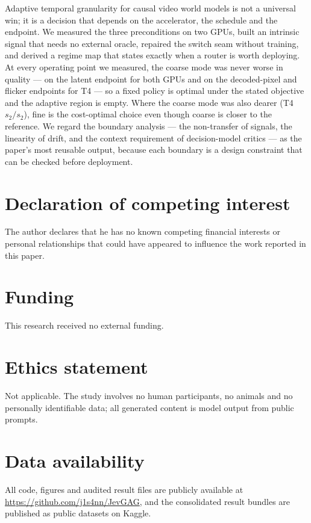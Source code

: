 \documentclass[review]{cas-sc}          %
\begin{document}
Adaptive temporal granularity for causal video world models is not a universal win; it is a decision that
depends on the accelerator, the schedule and the endpoint. We measured the three preconditions on two
GPUs, built an intrinsic signal that needs no external oracle, repaired the switch seam without training,
and derived a regime map that states exactly when a router is worth deploying. At every operating point we
measured, the coarse mode was never worse in quality --- on the latent endpoint for both GPUs and on the
decoded-pixel and flicker endpoints for T4 --- so a fixed policy is optimal under the stated objective and
the adaptive region is empty. Where the coarse mode was also dearer (T4 $s_2/s_2$), fine is the
cost-optimal choice even though coarse is closer to the reference. We regard the boundary analysis --- the
non-transfer of signals, the linearity of drift, and the context requirement of decision-model critics ---
as the paper's most reusable output, because each boundary is a design constraint that can be checked
before deployment.

\section*{Declaration of competing interest}
The author declares that he has no known competing financial interests or personal relationships that
could have appeared to influence the work reported in this paper.

\section*{Funding}
This research received no external funding.

\section*{Ethics statement}
Not applicable. The study involves no human participants, no animals and no personally identifiable data;
all generated content is model output from public prompts.

\section*{Data availability}
All code, figures and audited result files are publicly available at
\url{https://github.com/j1s4nn/JevGAG}, and the consolidated result bundles are published as public
datasets on Kaggle.
\end{document}
